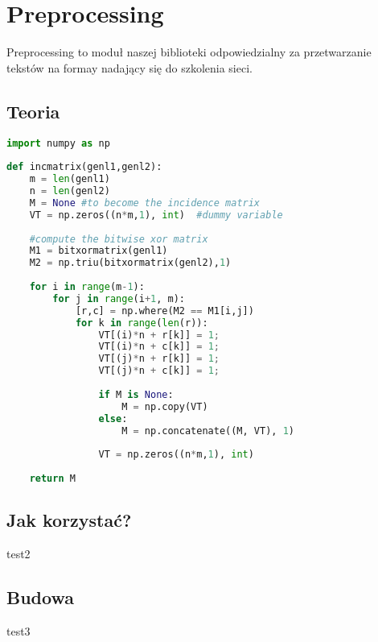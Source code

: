 \newpage
\section{Preprocessing}

Preprocessing to moduł naszej biblioteki odpowiedzialny za przetwarzanie tekstów na formay
nadający się do szkolenia sieci. 

\subsection{Teoria}
\begin{lstlisting}[language=Python]
import numpy as np
 
def incmatrix(genl1,genl2):
    m = len(genl1)
    n = len(genl2)
    M = None #to become the incidence matrix
    VT = np.zeros((n*m,1), int)  #dummy variable
 
    #compute the bitwise xor matrix
    M1 = bitxormatrix(genl1)
    M2 = np.triu(bitxormatrix(genl2),1) 
 
    for i in range(m-1):
        for j in range(i+1, m):
            [r,c] = np.where(M2 == M1[i,j])
            for k in range(len(r)):
                VT[(i)*n + r[k]] = 1;
                VT[(i)*n + c[k]] = 1;
                VT[(j)*n + r[k]] = 1;
                VT[(j)*n + c[k]] = 1;
 
                if M is None:
                    M = np.copy(VT)
                else:
                    M = np.concatenate((M, VT), 1)
 
                VT = np.zeros((n*m,1), int)
 
    return M
\end{lstlisting}

\subsection{Jak korzystać?}
test2 

\subsection{Budowa}
test3 